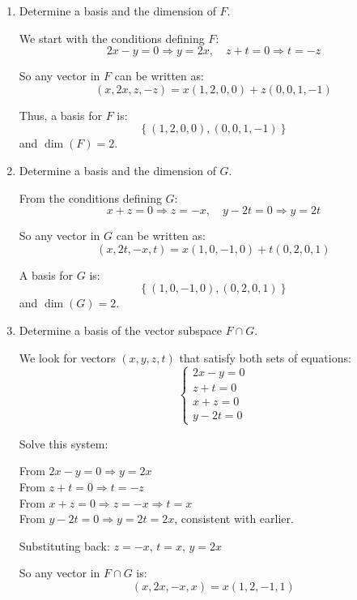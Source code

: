 \documentclass[12pt]{article}
\begin{document}
\begin{answerbox}
\begin{enumerate}
  \item Determine a basis and the dimension of $ F $.
  
      We start with the conditions defining $ F $:
      $$
      2x - y = 0 \Rightarrow y = 2x, \quad z + t = 0 \Rightarrow t = -z
      $$
      
      So any vector in $ F $ can be written as:
      $$
      (x, 2x, z, -z) = x(1, 2, 0, 0) + z(0, 0, 1, -1)
      $$

      Thus, a basis for $ F $ is:
      $$
      \left\{(1, 2, 0, 0), (0, 0, 1, -1)\right\}
      $$
      and $\dim(F) = 2$.

  \item Determine a basis and the dimension of $ G $.
  
      From the conditions defining $ G $:
      $$
      x + z = 0 \Rightarrow z = -x, \quad y - 2t = 0 \Rightarrow y = 2t
      $$

      So any vector in $ G $ can be written as:
      $$
      (x, 2t, -x, t) = x(1, 0, -1, 0) + t(0, 2, 0, 1)
      $$

      A basis for $ G $ is:
      $$
      \left\{(1, 0, -1, 0), (0, 2, 0, 1)\right\}
      $$
      and $\dim(G) = 2$.

  \item Determine a basis of the vector subspace $ F \cap G $.
  
      We look for vectors $(x, y, z, t)$ that satisfy both sets of equations:
      $$
      \begin{cases}
      2x - y = 0 \\
      z + t = 0 \\
      x + z = 0 \\
      y - 2t = 0
      \end{cases}
      $$

      Solve this system:

      From $ 2x - y = 0 \Rightarrow y = 2x $\\
      From $ z + t = 0 \Rightarrow t = -z $\\
      From $ x + z = 0 \Rightarrow z = -x \Rightarrow t = x $\\
      From $ y - 2t = 0 \Rightarrow y = 2t = 2x $, consistent with earlier.

      Substituting back: $ z = -x $, $ t = x $, $ y = 2x $

      So any vector in $ F \cap G $ is:
      $$
      (x, 2x, -x, x) = x(1, 2, -1, 1)
      $$


\end{enumerate}
\end{answerbox}
\end{document}
